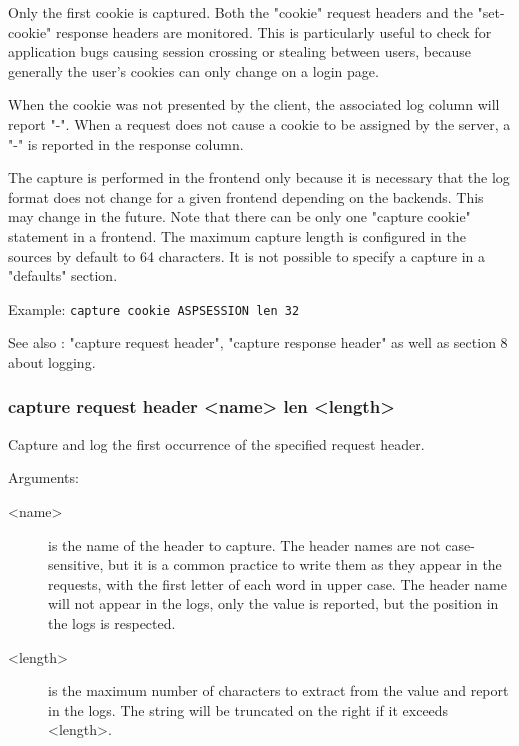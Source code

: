   Only the first cookie is captured. Both the "cookie" request headers and the
  "set-cookie" response headers are monitored. This is particularly useful to
  check for application bugs causing session crossing or stealing between
  users, because generally the user's cookies can only change on a login page.

  When the cookie was not presented by the client, the associated log column
  will report "-". When a request does not cause a cookie to be assigned by the
  server, a "-" is reported in the response column.

  The capture is performed in the frontend only because it is necessary that
  the log format does not change for a given frontend depending on the
  backends. This may change in the future. Note that there can be only one
  "capture cookie" statement in a frontend. The maximum capture length is
  configured in the sources by default to 64 characters. It is not possible to
  specify a capture in a "defaults" section.

  Example:
        \verb|capture cookie ASPSESSION len 32|

  See also : "capture request header", "capture response header" as well as
            section 8 about logging.

\subsubsection[capture request]{capture request header <name> len <length>}
  Capture and log the first occurrence of the specified request header.

  
  Arguments:
  \begin{description}
  \item[<name>]    is the name of the header to capture. The header names are not
              case-sensitive, but it is a common practice to write them as they
              appear in the requests, with the first letter of each word in
              upper case. The header name will not appear in the logs, only the
              value is reported, but the position in the logs is respected.

  \item[<length>]  is the maximum number of characters to extract from the value and
              report in the logs. The string will be truncated on the right if
              it exceeds <length>.
  \end{description}

